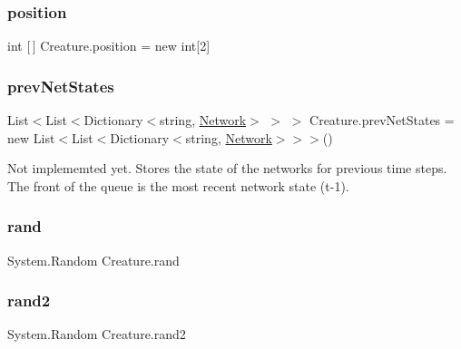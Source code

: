 \subsubsection{\texorpdfstring{position}{position}}
{\footnotesize\ttfamily int \mbox{[}$\,$\mbox{]} Creature.\+position = new int\mbox{[}2\mbox{]}}

\mbox{\label{class_creature_a36cd0e998e4f26599c6b31a54b5d30ac}} 
\subsubsection{\texorpdfstring{prev\+Net\+States}{prevNetStates}}
{\footnotesize\ttfamily List$<$List$<$Dictionary$<$string, \mbox{\hyperlink{class_network}{Network}}$>$ $>$ $>$ Creature.\+prev\+Net\+States = new List$<$List$<$Dictionary$<$string, \mbox{\hyperlink{class_network}{Network}}$>$$>$$>$()}



Not implememted yet. Stores the state of the networks for previous time steps. The front of the queue is the most recent network state (t-\/1). 

\mbox{\label{class_creature_ab3b01072caf7d87c396a2d80a3d73412}} 
\subsubsection{\texorpdfstring{rand}{rand}}
{\footnotesize\ttfamily System.\+Random Creature.\+rand}

\mbox{\label{class_creature_a08184ad607f5105788e09e8501386da0}} 
\subsubsection{\texorpdfstring{rand2}{rand2}}
{\footnotesize\ttfamily System.\+Random Creature.\+rand2}

\mbox{\label{class_creature_a52e3662ae3e269ee2cdc73b716fa3455}} 
